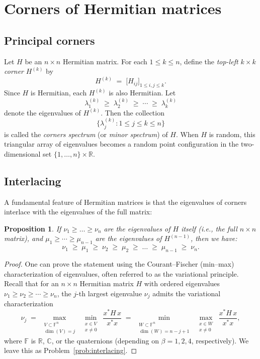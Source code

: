 \documentclass[letterpaper,11pt,oneside,reqno]{article}
\numberwithin{equation}{section}
\newtheorem{proposition}{Proposition}[section]
\theoremstyle{definition}
\begin{document}
\section{Corners of Hermitian matrices}
\label{sec:corners-definition}

\subsection{Principal corners}
Let $H$ be an $n\times n$ Hermitian matrix. For each $1\le k\le n$, define the \emph{top-left $k\times k$ corner} $H^{(k)}$ by
\[
	H^{(k)} \;=\; \bigl[H_{ij}\bigr]_{1\le i,j \le k}.
\]
Since $H$ is Hermitian, each $H^{(k)}$ is also Hermitian. Let
\[
	\lambda_1^{(k)} \;\ge\;\lambda_2^{(k)}\;\ge\;\cdots\;\ge\;\lambda_k^{(k)}
\]
denote the eigenvalues of $H^{(k)}$. Then the collection
\[
	\bigl\{\lambda_j^{(k)} : 1\le j\le k \le n\bigr\}
\]
is called the \emph{corners spectrum} (or \emph{minor
spectrum}) of $H$. When $H$ is random, this triangular array
of eigenvalues becomes a random point configuration in the
two-dimensional set $\{1,\dots,n\}\times \mathbb{R}$.

\subsection{Interlacing}
A fundamental feature of Hermitian matrices is that the eigenvalues of corners interlace with the eigenvalues of the full matrix:
\begin{proposition}
	\label{prop:interlacing}
If $\nu_1\ge\dots\ge \nu_n$ are the eigenvalues of $H$ itself (i.e., the full $n\times n$ matrix), and $\mu_1\ge\cdots\ge\mu_{n-1}$ are the eigenvalues of $H^{(n-1)}$, then we have:
\[
\nu_1\;\ge\;\mu_1\;\ge\;\nu_2\;\ge\;\mu_2\;\ge\;\dots\;\ge\;\mu_{n-1}\;\ge\;\nu_n.
\]
\end{proposition}
\begin{proof}
One can prove the statement using the Courant--Fischer
(min--max) characterization of eigenvalues, often referred
to as the variational principle. Recall that for an
\(n\times n\) Hermitian matrix \(H\) with ordered
eigenvalues \(\nu_1 \ge \nu_2 \ge \cdots \ge \nu_n\), the
\(j\)-th largest eigenvalue \(\nu_j\) admits the variational
characterization
\[
\nu_j
\;=\;
\max_{\substack{V\subset\mathbb{F}^n\\\dim(V)=j}}
\;\min_{\substack{x\in V \\ x\neq 0}}
\;
\frac{x^\ast H\,x}{x^\ast x}
\;=\;
\min_{\substack{W\subset\mathbb{F}^n\\\dim(W)=n-j+1}}
\;\max_{\substack{x\in W \\ x\neq 0}}
\;
\frac{x^\ast H\,x}{x^\ast x},
\]
where \(\mathbb{F}\) is \(\mathbb{R}\), \(\mathbb{C}\), or
the quaternions (depending on \(\beta=1,2,4\),
respectively).
We leave this as Problem~\ref{prob:interlacing}.
\end{proof}
\end{document}
